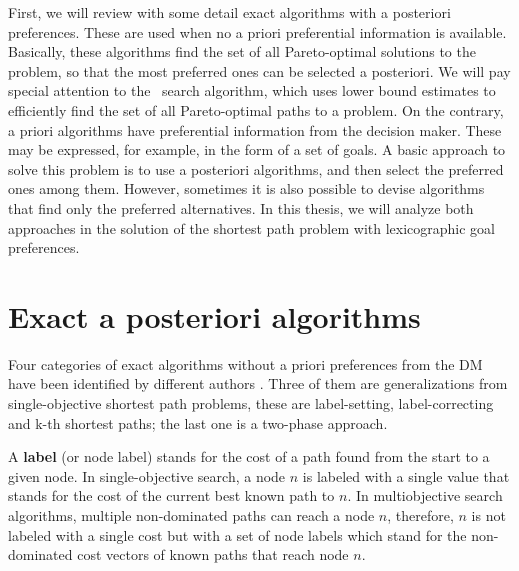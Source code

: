 First, we will review with some detail exact algorithms with a posteriori preferences. These are used when no a priori preferential information is available. Basically, these algorithms find the set of all Pareto-optimal solutions to the problem, so that the most preferred ones can be selected a posteriori. We will pay special attention to the \namoa \ search algorithm, which uses lower bound estimates to efficiently find the set of all Pareto-optimal paths to a problem. On the contrary, a priori algorithms have preferential information from the decision maker. These may be expressed, for example, in the form of a set of goals. A basic approach to solve this problem is to use a posteriori algorithms, and then select the preferred ones among them. However, sometimes it is also possible to devise algorithms that find only the preferred alternatives. In this thesis, we will analyze both approaches in the solution of the shortest path problem with lexicographic goal preferences.

\section{Exact a posteriori algorithms}
\label{chapMultiObjAlg:sec:a-posteriori}

Four categories of exact algorithms without a priori preferences from the DM have been identified by different authors \citep{skriverandersen2000,Raith2009,climacopascoal2012,Machuca2012a}. Three of them are generalizations from single-objective shortest path problems, these are label-setting, label-correcting and k-th shortest paths; the last one is a two-phase approach.

A \textbf{label} (or node label) stands for the cost of a path found from the start to a given node. In single-objective search, a node $n$ is labeled with a single value that stands for the cost of the current best known path to $n$. In multiobjective search algorithms, multiple non-dominated paths can reach a node $n$, therefore, $n$ is not labeled with a single cost but with a set of node labels which stand for the non-dominated cost vectors of known paths that reach node $n$.

